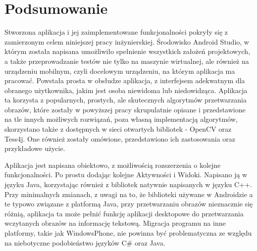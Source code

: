 \documentclass[eng,oneside]{mgr}
\begin{document}
\section{Podsumowanie}
Stworzona aplikacja i jej zaimplementowane funkcjonalności pokryły się z zamierzonym celem niniejszej pracy inżynierskiej. Środowisko Android Studio, w którym została napisana umożliwiło spełnienie wszystkich założeń projektowych, a także przeprowadzanie testów nie tylko na maszynie wirtualnej, ale również na urządzeniu mobilnym, czyli docelowym urządzeniu, na którym aplikacja ma pracować. Powstała prosta w obsłudze aplikacja, z interfejsem adekwatnym dla obranego użytkownika, jakim jest osoba niewidoma lub niedowidząca. Aplikacja ta korzysta z popularnych, prostych, ale skutecznych algorytmów przetwarzania obrazów, które zostały w powyższej pracy skrupulatnie opisane i przedstawione na tle innych możliwych rozwiązań, poza własną implementacją algorytmów, skorzystano także z dostępnych w sieci otwartych bibliotek - OpenCV oraz Tess4j. One również zostały omówione, przedstawiono ich zastosowania oraz przykładowe użycie.
\par Aplikacja jest napisana obiektowo, z możliwością rozszerzenia o kolejne funkcjonalności. Po prostu dodając kolejne Aktywności i Widoki. Napisano ją w języku Java, korzystając również z bibliotek natywnie napisanych w języku C++. Przy minimalnych zmianach, z uwagi na to, że biblioteki używane w Androidzie a te typowo związane z platformą Java, przy przetwarzaniu obrazów nieznacznie się różnią, aplikacja ta może pełnić funkcję aplikacji desktopowe do przetwarzania wczytanych obrazów na informację tekstową. Migracja programu na inne platformy, takie jak WindowsPhone, nie powinna być problematyczna ze względu na niebotyczne podobieństwo języków C\# oraz Java.
\end{document}
